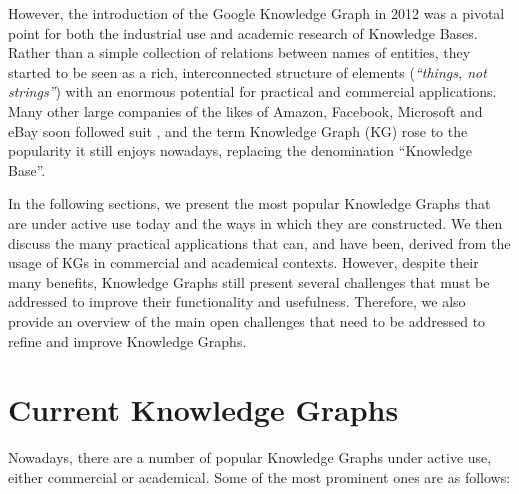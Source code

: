 However, the introduction of the Google Knowledge Graph in 2012 \cite{singhal2012} was a pivotal point for both the industrial use and academic research of Knowledge Bases. Rather than a simple collection of relations between names of entities, they started to be seen as a rich, interconnected structure of elements (\textit{``things, not strings''}) with an enormous potential for practical and commercial applications. Many other large companies of the likes of Amazon, Facebook, Microsoft and eBay soon followed suit \cite{shrivastava2017, krishnan2018, pittman2017, noy2019}, and the term Knowledge Graph (KG) rose to the popularity it still enjoys nowadays, replacing the denomination ``Knowledge Base''.

In the following sections, we present the most popular Knowledge Graphs that are under active use today and the ways in which they are constructed. We then discuss the many practical applications that can, and have been, derived from the usage of KGs in commercial and academical contexts. However, despite their many benefits, Knowledge Graphs still present several challenges that must be addressed to improve their functionality and usefulness. Therefore, we also provide an overview of the main open challenges that need to be addressed to refine and improve Knowledge Graphs.

\section{Current Knowledge Graphs}\label{sec:kgs-current}
Nowadays, there are a number of popular Knowledge Graphs under active use, either commercial or academical. Some of the most prominent ones are as follows:

